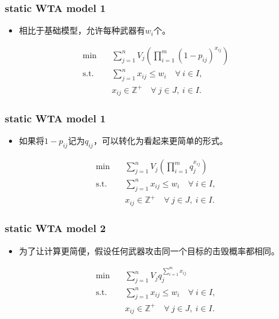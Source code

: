 \documentclass[CJK,10pt]{beamer}
\begin{document}
\begin{frame}
    \frametitle{static WTA model 1}
    \begin{itemize}
        \item 相比于基础模型，允许每种武器有$w_i$个。
    \end{itemize}
    \begin{align*} \tag{S1.1}
        \min\quad & \sum_{j=1}^n V_j \left( \prod_{i=1}^m (1 -  p_{ij})^{x_{ij}} \right) \\ 
        \mathrm{s. t.}\quad &\sum_{j=1}^n x_{ij} \leq w_i\quad \forall ~i \in I,\\
        & x_{ij} \in \mathbb{Z}^+ \quad \forall~ j\in J , ~ i \in I.
    \end{align*}
    
\end{frame}
\begin{frame}
    \frametitle{static WTA model 1}
    \begin{itemize}
        \item 如果将$1-p_{ij}$记为$q_{ij}$，可以转化为看起来更简单的形式。
    \end{itemize}
    \begin{align*} \tag{S1.2}
        \min\quad & \sum_{j=1}^n V_j \left( \prod_{i=1}^m q_j^{x_{ij}} \right) \\ 
        \mathrm{s. t.}\quad &\sum_{j=1}^n x_{ij} \leq w_i\quad \forall ~i \in I,\\
        & x_{ij} \in \mathbb{Z}^+ \quad \forall~ j\in J , ~ i \in I.
    \end{align*}
\end{frame}

\begin{frame}
    \frametitle{static WTA model 2}
    \begin{itemize}
        \item 为了让计算更简便，假设任何武器攻击同一个目标的击毁概率都相同。
    \end{itemize}
    \begin{align*} \tag{S2}
        \min\quad & \sum_{j=1}^n V_j q_j^{\sum_{i=1}^m x_{ij}} \\ 
        \mathrm{s. t.}\quad &\sum_{j=1}^n x_{ij} \leq w_i\quad \forall ~i \in I,\\
        & x_{ij} \in \mathbb{Z}^+ \quad \forall~ j\in J , ~ i \in I.
    \end{align*}
\end{frame}
\end{document}
